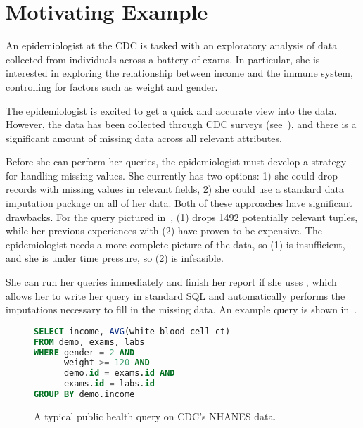 \section{Motivating Example}
An epidemiologist at the CDC is tasked with an 
exploratory analysis of data collected from individuals across
a battery of exams. In particular, she is interested in exploring
the relationship between income and the immune system,
controlling for factors such as weight and gender.

The epidemiologist is excited
to get a quick and accurate view into the data. However,
the data has been collected through CDC surveys (see~),
and there is a significant amount of missing data across all
relevant attributes. 

Before she can perform her queries, the epidemiologist must develop a strategy
for handling missing values. She currently has two options:
1) she could drop records with missing values in relevant fields,
2) she could use a standard data imputation package on all of her data. Both of these
approaches have significant drawbacks. For the query pictured in~, 
(1) drops 1492 potentially relevant tuples,
while her previous experiences with (2) have proven to be expensive. The epidemiologist needs a more complete picture
of the data, so (1) is insufficient, and she is under time pressure, so (2)
is infeasible.

She can run her queries immediately and finish her report if
she uses \ProjectName{}, which allows her to write her
query in standard SQL and automatically performs the imputations necessary to fill in the missing data.
An example query is shown in~.

\begin{figure}
\begin{lstlisting}[language=SQL]
SELECT income, AVG(white_blood_cell_ct)
FROM demo, exams, labs
WHERE gender = 2 AND 
      weight >= 120 AND
      demo.id = exams.id AND 
      exams.id = labs.id
GROUP BY demo.income
\end{lstlisting}
\caption{A typical public health query on CDC's NHANES data.}
\label{fig:example-query}
\end{figure}

